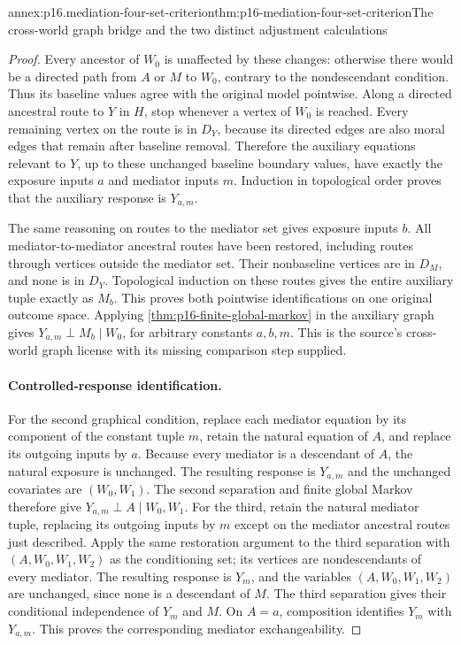 \begin{annexitem}{annex:p16.mediation-four-set-criterion}{thm:p16-mediation-four-set-criterion}{The cross-world graph bridge and the two distinct adjustment calculations}
\begin{proof}
Every ancestor of \(W_0\) is unaffected by these changes: otherwise
there would be a directed path from \(A\) or \(M\) to \(W_0\),
contrary to the nondescendant condition. Thus its baseline values agree
with the original model pointwise. Along a directed ancestral route
to \(Y\) in \(H\), stop whenever a vertex of \(W_0\) is reached.
Every remaining vertex on the route is in \(D_Y\), because its directed
edges are also moral edges that remain after baseline removal. Therefore
the auxiliary equations relevant to \(Y\), up to these unchanged
baseline boundary values, have exactly the exposure inputs \(a\) and
mediator inputs \(m\). Induction in topological order proves that the
auxiliary response is \(Y_{a,m}\).

The same reasoning on routes to the mediator set gives exposure inputs
\(b\). All mediator-to-mediator ancestral routes have been restored,
including routes through vertices outside the mediator set. Their
nonbaseline vertices are in \(D_M\), and none is in \(D_Y\).
Topological induction on these routes gives the entire auxiliary tuple
exactly as \(M_b\). This proves both pointwise
identifications on one original outcome space. Applying
\cref{thm:p16-finite-global-markov} in the auxiliary graph gives
\(Y_{a,m}\perp M_b\mid W_0\), for arbitrary constants \(a,b,m\).
This is the source's cross-world graph license with its missing comparison
step supplied.

\paragraph{Controlled-response identification.}
For the second graphical condition, replace each mediator equation by its
component of the constant tuple \(m\), retain the natural equation of \(A\),
and replace its outgoing inputs by \(a\). Because every mediator is a descendant of \(A\),
the natural exposure is unchanged. The resulting response is \(Y_{a,m}\)
and the unchanged covariates are \((W_0,W_1)\). The second separation
and finite global Markov therefore give
\(Y_{a,m}\perp A\mid W_0,W_1\).
For the third, retain the natural mediator tuple, replacing its outgoing
inputs by \(m\) except on the mediator ancestral routes just described.
Apply the same restoration argument to the third separation with
\((A,W_0,W_1,W_2)\) as the conditioning set; its vertices are
nondescendants of every mediator. The resulting response is \(Y_m\), and the variables
\((A,W_0,W_1,W_2)\) are unchanged, since none is a descendant of \(M\).
The third separation gives their conditional independence of \(Y_m\)
and \(M\). On \(A=a\), composition identifies \(Y_m\) with
\(Y_{a,m}\). This proves the corresponding mediator exchangeability.


\end{proof}
\end{annexitem}
